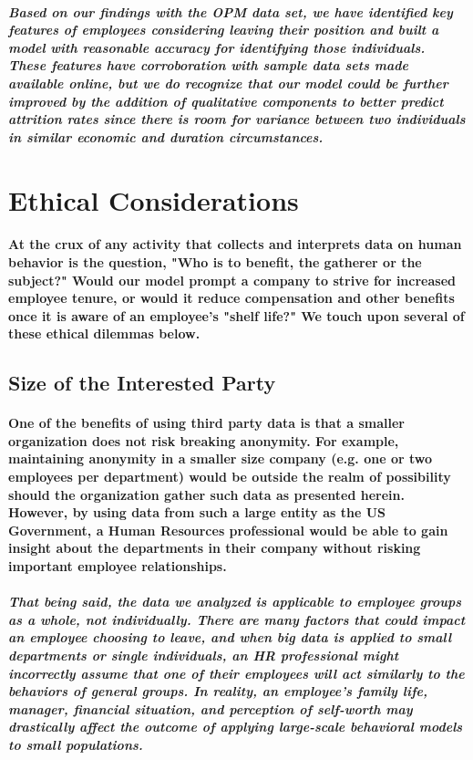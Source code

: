 \documentclass[10pt]{article}
\begin{document}
\subparagraph{Based on our findings with the OPM data set, we have identified key features of employees considering leaving their position and built a model with reasonable accuracy for identifying those individuals. These features have corroboration with sample data sets made available online, but we do recognize that our model could be further improved by the addition of qualitative components to better predict attrition rates since there is room for variance between two individuals in similar economic and duration circumstances.}
 
\section{Ethical Considerations}

\paragraph{At the crux of any activity that collects and interprets data on human behavior is the question, "Who is to benefit, the gatherer or the subject?" Would our model prompt a company to strive for increased employee tenure, or would it reduce compensation and other benefits once it is aware of an employee’s "shelf life?" We touch upon several of these ethical dilemmas below.}
 
\subsection{Size of the Interested Party}

\paragraph{One of the benefits of using third party data is that a smaller organization does not risk breaking anonymity. For example, maintaining anonymity in a smaller size company (e.g. one or two employees per department) would be outside the realm of possibility should the organization gather such data as presented herein. However, by using data from such a large entity as the US Government, a Human Resources professional would be able to gain insight about the departments in their company without risking important employee relationships.}
 
\subparagraph{That being said, the data we analyzed is applicable to employee groups as a whole, not individually. There are many factors that could impact an employee choosing to leave, and when big data is applied to small departments or single individuals, an HR professional might incorrectly assume that one of their employees will act similarly to the behaviors of general groups. In reality, an employee’s family life, manager, financial situation, and perception of self-worth may drastically affect the outcome of applying large-scale behavioral models to small populations.}
 
\end{document}
